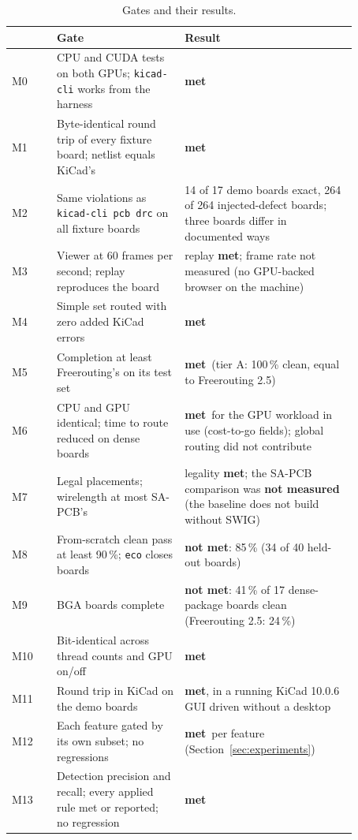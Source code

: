 \documentclass[10pt,a4paper]{article}
\newcommand{\code}[1]{\texttt{#1}}
\newcommand{\notmet}{\textcolor{frorange}{\textbf{not met}}}
\newcommand{\met}{\textcolor{fraqua}{\textbf{met}}}
\begin{document}
\begin{table}[H]
\centering\small
\begin{tabular}{@{}lp{0.37\linewidth}p{0.50\linewidth}@{}}
\toprule
 & Gate & Result \\
\midrule
M0 & CPU and CUDA tests on both GPUs; \code{kicad-cli} works from the harness & \met \\
M1 & Byte-identical round trip of every fixture board; netlist equals KiCad's & \met \\
M2 & Same violations as \code{kicad-cli pcb drc} on all fixture boards & 14 of 17 demo boards exact, 264 of 264 injected-defect boards; three boards differ in documented ways \\
M3 & Viewer at 60 frames per second; replay reproduces the board & replay \met; frame rate not measured (no GPU-backed browser on the machine) \\
M4 & Simple set routed with zero added KiCad errors & \met \\
M5 & Completion at least Freerouting's on its test set & \met\ (tier A: 100\,\% clean, equal to Freerouting 2.5) \\
M6 & CPU and GPU identical; time to route reduced on dense boards & \met\ for the GPU workload in use (cost-to-go fields); global routing did not contribute \\
M7 & Legal placements; wirelength at most SA-PCB's & legality \met; the SA-PCB comparison was \textbf{not measured} (the baseline does not build without SWIG) \\
M8 & From-scratch clean pass at least 90\,\%; \code{eco} closes boards & \notmet: 85\,\% (34 of 40 held-out boards) \\
M9 & BGA boards complete & \notmet: 41\,\% of 17 dense-package boards clean (Freerouting 2.5: 24\,\%) \\
M10 & Bit-identical across thread counts and GPU on/off & \met \\
M11 & Round trip in KiCad on the demo boards & \met, in a running KiCad 10.0.6 GUI driven without a desktop \\
M12 & Each feature gated by its own subset; no regressions & \met\ per feature (Section~\ref{sec:experiments}) \\
M13 & Detection precision and recall; every applied rule met or reported; no regression & \met \\
\bottomrule
\end{tabular}
\caption{Gates and their results.}
\label{tab:gates}
\end{table}
\end{document}
